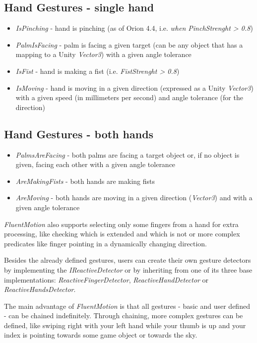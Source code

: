 \documentclass[chi_draft]{sigchi}
\def\fluentmotion{\textit{FluentMotion}}
\begin{document}
\subsection{Hand Gestures - single hand}

\begin{itemize}
  \item \textit{IsPinching} - hand is pinching (as of Orion 4.4, i.e. \textit{when PinchStrenght > 0.8})
  \item \textit{PalmIsFacing} - palm is facing a given target (can be any object that has a mapping to a Unity \textit{Vector3}) with a given angle tolerance
  \item  \textit{IsFist} - hand is making a fist (i.e. \textit{FistStrenght > 0.8})
  \item \textit{IsMoving} - hand is moving in a given direction (expressed as a Unity \textit{Vector3}) with a given speed (in millimeters per second) and angle tolerance (for the direction) 
\end{itemize}

\subsection{Hand Gestures - both hands}
\begin{itemize}
  \item \textit{PalmsAreFacing} - both palms are facing a target object or, if no object is given, facing each other with a given angle tolerance
  \item \textit{AreMakingFists} - both hands are making fists
  \item \textit{AreMoving} - both hands are moving in a given direction (\textit{Vector3}) and with a given angle tolerance
\end{itemize}

\fluentmotion{} also supports selecting only some fingers from a hand for extra processing, like checking which is extended and which is not or more complex predicates like finger pointing in a dynamically changing direction.


Besides the already defined gestures, users can create their own gesture detectors by implementing the \textit{IReactiveDetector} or by inheriting from one of its three base implementations: \textit{ReactiveFingerDetector}, \textit{ReactiveHandDetector} or \textit{ReactiveHandsDetector}.


The main advantage of \fluentmotion{} is that all gestures - basic and user defined - can be chained indefinitely. Through chaining, more complex gestures can be defined, like swiping right with your left hand while your thumb is up and your index is pointing towards some game object or towards the sky.
\end{document}
